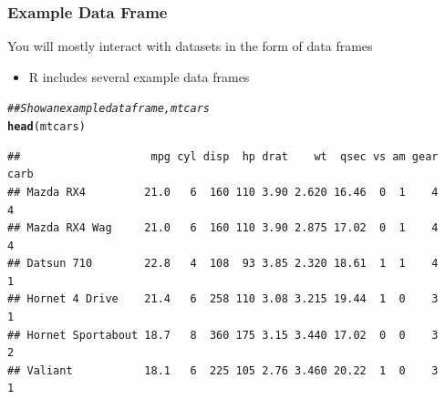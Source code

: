 \documentclass{beamer}\usepackage[]{graphicx}\usepackage[]{color}
\makeatletter
\newcommand{\hlcom}[1]{\textcolor[rgb]{0.678,0.584,0.686}{\textit{#1}}}%
\newcommand{\hlstd}[1]{\textcolor[rgb]{0.345,0.345,0.345}{#1}}%
\newcommand{\hlkwd}[1]{\textcolor[rgb]{0.737,0.353,0.396}{\textbf{#1}}}%
\newenvironment{kframe}{%
 \def\at@end@of@kframe{}%
 \ifinner\ifhmode%
  \def\at@end@of@kframe{\end{minipage}}%
  \begin{minipage}{\columnwidth}%
 \fi\fi%
 \def\FrameCommand##1{\hskip\@totalleftmargin \hskip-\fboxsep
 \colorbox{shadecolor}{##1}\hskip-\fboxsep
     \hskip-\linewidth \hskip-\@totalleftmargin \hskip\columnwidth}%
 \MakeFramed {\advance\hsize-\width
   \@totalleftmargin\z@ \linewidth\hsize
   \@setminipage}}%
 {\par\unskip\endMakeFramed%
 \at@end@of@kframe}
\newenvironment{knitrout}{}{} %
\makeatother
\begin{document}
\begin{frame}[fragile]\frametitle{Example Data Frame}
    You will mostly interact with datasets in the form of data frames
    \begin{itemize}
        \item R includes several example data frames
    \end{itemize}
\begin{knitrout}\footnotesize
{}\color{fgcolor}\begin{kframe}
\begin{alltt}
\hlcom{## Show an example data frame, mtcars}
\hlkwd{head}\hlstd{(mtcars)}
\end{alltt}
\begin{verbatim}
##                    mpg cyl disp  hp drat    wt  qsec vs am gear carb
## Mazda RX4         21.0   6  160 110 3.90 2.620 16.46  0  1    4    4
## Mazda RX4 Wag     21.0   6  160 110 3.90 2.875 17.02  0  1    4    4
## Datsun 710        22.8   4  108  93 3.85 2.320 18.61  1  1    4    1
## Hornet 4 Drive    21.4   6  258 110 3.08 3.215 19.44  1  0    3    1
## Hornet Sportabout 18.7   8  360 175 3.15 3.440 17.02  0  0    3    2
## Valiant           18.1   6  225 105 2.76 3.460 20.22  1  0    3    1
\end{verbatim}
\end{kframe}
\end{knitrout}
\end{frame}
\end{document}
